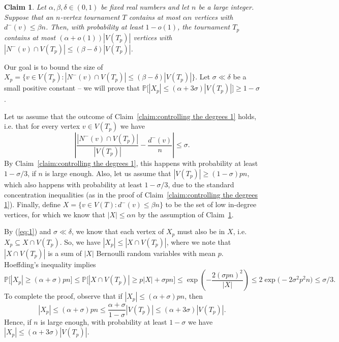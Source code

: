\documentclass[a4paper,11pt]{article}
\makeatletter
\renewenvironment{proof}[1][\proofname] {\par\pushQED{\qed}\normalfont\topsep6\p@\@plus6\p@\relax\trivlist\item[\hskip\labelsep\textit{#1}\@addpunct{.}]\ignorespaces}{\popQED\endtrivlist\@endpefalse}
\newtheorem{claim}[theorem]{\bf Claim}
\theoremstyle{definition}
\def\Pb{\mathbb{P}}
\makeatother
\begin{document}
\begin{claim}\label{claim:controlling the degrees 2}
Let $\alpha, \beta, \delta \in (0, 1)$ be fixed real numbers and let $n$ be a large integer. Suppose that an $n$-vertex tournament $T$ contains at most $\alpha n$ vertices with $d^{-}(v)\leq \beta n$. Then, with probability at least $1-o(1)$, the tournament $T_p$ contains at most $(\alpha +o(1)) |V(T_p)|$ vertices with $|N^{-}(v)\cap V(T_p)|\leq (\beta -\delta) |V(T_p)|$. 
\end{claim}
\begin{proof}
Our goal is to bound the size of $X_p=\{v\in V(T_p):|N^{-}(v)\cap V(T_p)|\leq (\beta -\delta) |V(T_p)|\}$. Let $\sigma \ll \delta$ be a small positive constant -- we will prove that $\Pb\big[|X_p|\leq (\alpha+3\sigma)|V(T_p)|\big]\geq 1-\sigma$. 

Let us assume that the outcome of Claim~\ref{claim:controlling the degrees 1} holds, i.e. that for every vertex $v\in V(T_p)$ we have \begin{equation}\label{eq:1}
    \left|\frac{|N^-(v)\cap V(T_p)|}{|V(T_p)|}- \frac{d^-(v)}{n}\right|\leq \sigma.
\end{equation} By Claim~\ref{claim:controlling the degrees 1}, this happens with probability at least $1-\sigma/3$, if $n$ is large enough. Also, let us assume that $|V(T_p)|\geq (1-\sigma)pn$, which also happens with probability at least $1-\sigma/3$, due to the standard concentration inequalities (as in the proof of Claim~\ref{claim:controlling the degrees 1}). Finally, define $X=\{v\in V(T):d^-(v)\leq \beta n\}$ to be the set of low in-degree vertices, for which we know that $|X|\leq \alpha n$ by the assumption of Claim~\ref{claim:controlling the degrees 2}.

By (\ref{eq:1}) and $\sigma\ll \delta$, we know that each vertex of $X_p$ must also be in $X$, i.e. $X_p\subseteq X\cap V(T_p)$. So, we have $|X_p|\leq |X\cap V(T_p)|$, where we note that $|X\cap V(T_p)|$ is a sum of $|X|$ Bernoulli random variables with mean $p$. Hoeffding's inequality implies
\[\Pb\big[|X_p|\geq (\alpha+\sigma)p n \big]\leq \Pb\big[|X\cap V(T_p)|\geq p|X|+\sigma pn\big]\leq \exp\left(-\frac{2(\sigma p n)^2}{|X|} \right)\leq 2\exp\big(-2\sigma^2 p^2 n\big)\leq \sigma/3.\]
To complete the proof, observe that if $|X_p|\leq (\alpha+\sigma) pn$, then 
\[|X_p|\leq (\alpha+\sigma)p n\leq \frac{\alpha+\sigma}{1-\sigma}|V(T_p)|\leq (\alpha+3\sigma)|V(T_p)|.\]
Hence, if $n$ is large enough, with probability at least $1-\sigma$ we have $|X_p|\leq (\alpha+3\sigma)|V(T_p)|$.
\end{proof}
\end{document}
